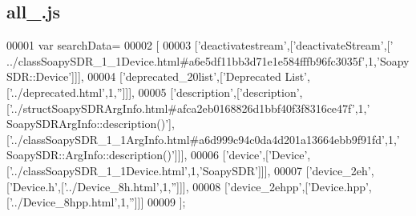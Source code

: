\subsection{all\+\_.\+js}
\label{all__3_8js_source}

\begin{DoxyCode}
00001 var searchData=
00002 [
00003   [\textcolor{stringliteral}{'deactivatestream'},[\textcolor{stringliteral}{'deactivateStream'},[\textcolor{stringliteral}{'
      ../classSoapySDR\_1\_1Device.html#a6e5df11bb3d71e1e584fffb96fc3035f'},1,\textcolor{stringliteral}{'SoapySDR::Device'}]]],
00004   [\textcolor{stringliteral}{'deprecated\_20list'},[\textcolor{stringliteral}{'Deprecated List'},[\textcolor{stringliteral}{'../deprecated.html'},1,\textcolor{stringliteral}{''}]]],
00005   [\textcolor{stringliteral}{'description'},[\textcolor{stringliteral}{'description'},[\textcolor{stringliteral}{'../structSoapySDRArgInfo.html#afca2eb0168826d1bbf40f3f8316ce47f'},1,\textcolor{stringliteral}{'
      SoapySDRArgInfo::description()'}],[\textcolor{stringliteral}{'../classSoapySDR\_1\_1ArgInfo.html#a6d999c94c0da4d201a13664ebb9f91fd'},1,\textcolor{stringliteral}{'
      SoapySDR::ArgInfo::description()'}]]],
00006   [\textcolor{stringliteral}{'device'},[\textcolor{stringliteral}{'Device'},[\textcolor{stringliteral}{'../classSoapySDR\_1\_1Device.html'},1,\textcolor{stringliteral}{'SoapySDR'}]]],
00007   [\textcolor{stringliteral}{'device\_2eh'},[\textcolor{stringliteral}{'Device.h'},[\textcolor{stringliteral}{'../Device\_8h.html'},1,\textcolor{stringliteral}{''}]]],
00008   [\textcolor{stringliteral}{'device\_2ehpp'},[\textcolor{stringliteral}{'Device.hpp'},[\textcolor{stringliteral}{'../Device\_8hpp.html'},1,\textcolor{stringliteral}{''}]]]
00009 ];
\end{DoxyCode}
